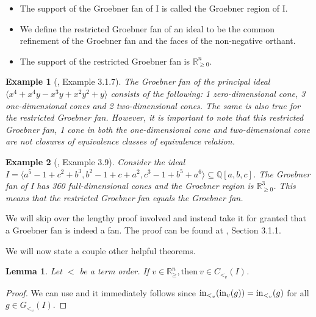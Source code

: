 \documentclass[12pt,a4paper]{report}
\newtheorem{example}{Example}
\newtheorem{lemma}{Lemma}
\begin{document}
\begin{itemize}
    \item The support of the Groebner fan of I is called the Groebner region of I.
    \item We define the restricted Groebner fan of an ideal to be the common refinement of the Groebner fan and the faces of the non-negative orthant.
    \item The support of the restricted Groebner fan is $\mathbb R_{\geq 0} ^{n}$.
\end{itemize}



\begin{example}[\cite{AndersPHD}, Example 3.1.7]
The Groebner fan of the principal ideal $\langle x^4 + x^4 y - x^3 y + x^2 y^2 + y \rangle$ consists of the following: 1 zero-dimensional cone, 3 one-dimensional cones and 2 two-dimensional cones. The same is also true for the restricted Groebner fan. However, it is important to note that this restricted Groebner fan, 1 cone in both the one-dimensional cone and two-dimensional cone are not closures of equivalence classes of equivalence relation.
\end{example}


\begin{example}[\cite{BSturmfelz}, Example 3.9]

Consider the ideal $I = \langle a^5 - 1 + c^2 + b^3, b^2 - 1 + c + a^2, c^3 - 1 + b^5 + a^6 \rangle \subseteq \mathbb{Q} [a,b,c] $. The Groebner fan of I has 360 full-dimensional cones and the Groebner region is $\mathbb{R}_{\geq 0}^{3}$. This means that the restricted Groebner fan equals the Groebner fan. 
\end{example}

We will skip over the lengthy proof involved and instead take it for granted that a Groebner fan is indeed a fan. The proof can be found at \cite{AndersPHD}, Section 3.1.1.

We will now state a couple other helpful theorems.


\begin{lemma}
Let $<$ be a term order. If $v \in \mathbb{R}_{\geq}^{n}, \text{then} \: v \in C_{{<}_{v}} (I)$.
\end{lemma}


\begin{proof}
We can use \cite[Corollary 3.1.10]{AndersPHD} and it immediately follows since $\operatorname{in}_{{<}_{v}} (\operatorname{in}_{v} (g)) = \operatorname{in}_{{<}_{v}} (g)$ for all $g \in G_{{<}_{v}} (I)$.
\end{proof}
\end{document}
